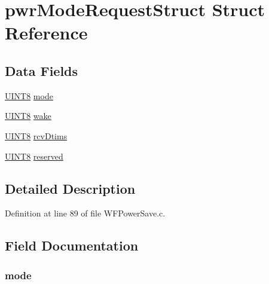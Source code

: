\hypertarget{structpwr_mode_request_struct}{}\section{pwr\+Mode\+Request\+Struct Struct Reference}
\label{structpwr_mode_request_struct}
\subsection*{Data Fields}
\begin{DoxyCompactItemize}
\item 
\hyperlink{_generic_type_defs_8h_ab27e9918b538ce9d8ca692479b375b6a}{U\+I\+N\+T8} \hyperlink{structpwr_mode_request_struct_a7d61d79fa98a45545166420dec0d8f3d}{mode}
\item 
\hyperlink{_generic_type_defs_8h_ab27e9918b538ce9d8ca692479b375b6a}{U\+I\+N\+T8} \hyperlink{structpwr_mode_request_struct_a57f47e7e5da0739eb8c9b2cb1326f2cb}{wake}
\item 
\hyperlink{_generic_type_defs_8h_ab27e9918b538ce9d8ca692479b375b6a}{U\+I\+N\+T8} \hyperlink{structpwr_mode_request_struct_a48e4d42b0de0d9eb44bc962b2d393ed0}{rcv\+Dtims}
\item 
\hyperlink{_generic_type_defs_8h_ab27e9918b538ce9d8ca692479b375b6a}{U\+I\+N\+T8} \hyperlink{structpwr_mode_request_struct_a61b1cfce69fc0011cd7b07b127a3f3f6}{reserved}
\end{DoxyCompactItemize}


\subsection{Detailed Description}


Definition at line 89 of file W\+F\+Power\+Save.\+c.



\subsection{Field Documentation}
\hypertarget{structpwr_mode_request_struct_a7d61d79fa98a45545166420dec0d8f3d}{}
\subsubsection[{mode}]{ mode}\label{structpwr_mode_request_struct_a7d61d79fa98a45545166420dec0d8f3d}


